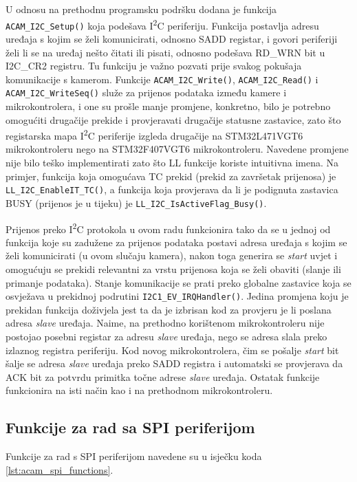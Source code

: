 \noindent U odnosu na prethodnu programsku podršku dodana je funkcija \verb|ACAM_I2C_Setup()| koja podešava I\textsuperscript{2}C periferiju. Funkcija postavlja adresu uređaja s kojim se želi komunicirati, odnosno SADD registar, i govori periferiji želi li se na uređaj nešto čitati ili pisati, odnosno podešava RD\_WRN bit u I2C\_CR2 registru. Tu funkciju je važno pozvati prije svakog pokušaja komunikacije s kamerom. Funkcije \verb|ACAM_I2C_Write()|,  \verb|ACAM_I2C_Read()| i \verb|ACAM_I2C_WriteSeq()| služe za prijenos podataka između kamere i mikrokontrolera, i one su prošle manje promjene, konkretno, bilo je potrebno omogućiti drugačije prekide i provjeravati drugačije statusne zastavice, zato što registarska mapa I\textsuperscript{2}C periferije izgleda drugačije na STM32L471VGT6 mikrokontroleru nego na STM32F407VGT6 mikrokontroleru. Navedene promjene nije bilo teško implementirati zato što LL funkcije koriste intuitivna imena. Na primjer, funkcija koja omogućava TC prekid (prekid za završetak prijenosa) je \verb|LL_I2C_EnableIT_TC()|, a funkcija koja provjerava da li je podignuta zastavica BUSY (prijenos je u tijeku) je \verb|LL_I2C_IsActiveFlag_Busy()|.

Prijenos preko I\textsuperscript{2}C protokola u ovom radu funkcionira tako da se u jednoj od funkcija koje su zadužene za prijenos podataka postavi adresa uređaja s kojim se želi komunicirati (u ovom slučaju kamera), nakon toga generira se \textit{start} uvjet i omogućuju se prekidi relevantni za vrstu prijenosa koja se želi obaviti (slanje ili primanje podataka). Stanje komunikacije se prati preko globalne zastavice koja se osvježava u prekidnoj podrutini \verb|I2C1_EV_IRQHandler()|. Jedina promjena koju je prekidan funkcija doživjela jest ta da je izbrisan kod za provjeru je li poslana adresa \textit{slave} uređaja. Naime, na prethodno korištenom mikrokontroleru nije postojao posebni registar za adresu \textit{slave} uređaja, nego se adresa slala preko izlaznog registra periferiju. Kod novog mikrokontrolera, čim se pošalje \textit{start} bit šalje se adresa \textit{slave} uređaja preko SADD registra i automatski se provjerava da ACK bit za potvrdu primitka točne adrese \textit{slave} uređaja. Ostatak funkcije funkcionira na isti način kao i na prethodnom mikrokontroleru.

\subsection{Funkcije za rad sa SPI periferijom}

Funkcije za rad s SPI periferijom navedene su u isječku koda \ref{lst:acam_spi_functions}.

